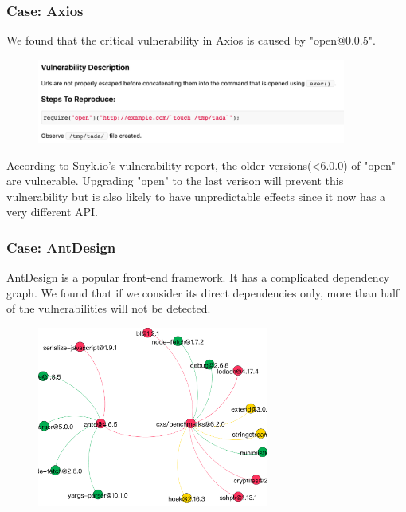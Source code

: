 \documentclass[notheorems, aspectratio=54]{beamer}
\def\parchmentframe#1{
\tikz{
  \node[inner sep=1.5em] (A) {#1};  %
  \begin{pgfonlayer}{background}  %
  \fill[normal border] 
        (A.south east) -- (A.south west) -- 
        (A.north west) -- (A.north east) -- cycle;
  \end{pgfonlayer}}}
\def\parchmentframetop#1{
\tikz{
  \node[inner sep=2em] (A) {#1};    %
  \begin{pgfonlayer}{background}    
  \fill[normal border]              %
        (A.south east) -- (A.south west) -- 
        (A.north west) -- (A.north east) -- cycle;
  \fill[torn border]                %
        ($(A.south east)-(0,.2)$) -- ($(A.south west)-(0,.2)$) -- 
        ($(A.south west)+(0,.2)$) -- ($(A.south east)+(0,.2)$) -- cycle;
  \end{pgfonlayer}}}
\def\parchmentframebottom#1{
\tikz{
  \node[inner sep=2em] (A) {#1};   %
  \begin{pgfonlayer}{background}   
  \fill[normal border]             %
        (A.south east) -- (A.south west) -- 
        (A.north west) -- (A.north east) -- cycle;
  \fill[torn border]               %
        ($(A.north east)-(0,.2)$) -- ($(A.north west)-(0,.2)$) -- 
        ($(A.north west)+(0,.2)$) -- ($(A.north east)+(0,.2)$) -- cycle;
  \end{pgfonlayer}}}
\def\parchmentframemiddle#1{
\tikz{
  \node[inner sep=2em] (A) {#1};   %
  \begin{pgfonlayer}{background}   
  \fill[normal border]             %
        (A.south east) -- (A.south west) -- 
        (A.north west) -- (A.north east) -- cycle;
  \fill[torn border]               %
        ($(A.south east)-(0,.2)$) -- ($(A.south west)-(0,.2)$) -- 
        ($(A.south west)+(0,.2)$) -- ($(A.south east)+(0,.2)$) -- cycle;
  \fill[torn border]               %
        ($(A.north east)-(0,.2)$) -- ($(A.north west)-(0,.2)$) -- 
        ($(A.north west)+(0,.2)$) -- ($(A.north east)+(0,.2)$) -- cycle;
  \end{pgfonlayer}}}
\newenvironment{parchment}[1][Example]{%
  \def\FrameCommand{\parchmentframe}%
  \def\FirstFrameCommand{\parchmentframetop}%
  \def\LastFrameCommand{\parchmentframebottom}%
  \def\MidFrameCommand{\parchmentframemiddle}%
  \vskip\baselineskip
  \MakeFramed {\FrameRestore}
  \noindent\tikz\node[inner sep=1ex, draw=black!20,fill=AmethystPurple, 
          anchor=west, overlay] at (0em, 1em) {\sffamily#1};\par}%
{\endMakeFramed}
\begin{document}
\begin{frame}
    \frametitle{Case: Axios}
    We found that the critical vulnerability in Axios is caused by "open@0.0.5".
    \begin{figure}
        \includegraphics[width=4in]{figures/open.png}
    \end{figure}
    According to Snyk.io's vulnerability report, the older versions(<6.0.0) of "open" are vulnerable. Upgrading "open" to the last verison will prevent this vulnerability but is also likely to have unpredictable effects since it now has a very different API.
\end{frame}

\begin{frame}
    \frametitle{Case: AntDesign}
    AntDesign is a popular front-end framework. It has a complicated dependency graph. We found that if we consider its direct dependencies only, more than half of the vulnerabilities will not be detected.
    \begin{figure}
        \includegraphics[width=3in]{figures/antd.pdf}
    \end{figure}
\end{frame}

\end{document}
